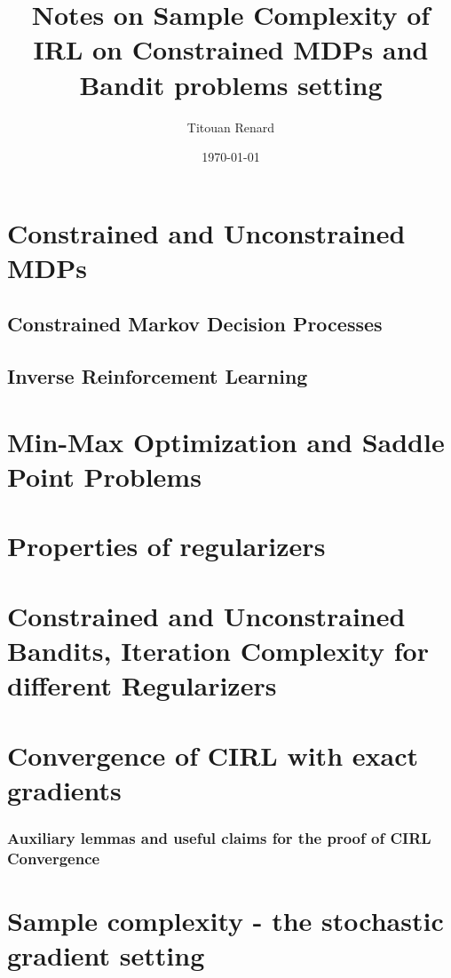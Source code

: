 \documentclass[11pt]{article}
\title{Notes on Sample Complexity of IRL on Constrained MDPs and Bandit problems setting}
\date{\today}
\author{Titouan Renard}
\numberwithin{equation}{section}
\begin{document}
\maketitle	

\tableofcontents

\section{Constrained and Unconstrained MDPs}


\newpage
\subsection{Constrained Markov Decision Processes} \label{sec:cmdps}


\newpage
\subsection{Inverse Reinforcement Learning} \label{sec:irl}


\newpage
\section{Min-Max Optimization and Saddle Point Problems}


\section{Properties of regularizers}


\newpage
\section{Constrained and Unconstrained Bandits, Iteration Complexity for different Regularizers}



% 


\newpage
\section{Convergence of CIRL with exact gradients}

\newpage
\subsubsection{Auxiliary lemmas and useful claims for the proof of CIRL Convergence}


\newpage
\section{Sample complexity - the stochastic gradient setting}




\newpage
\printbibliography
\end{document}
